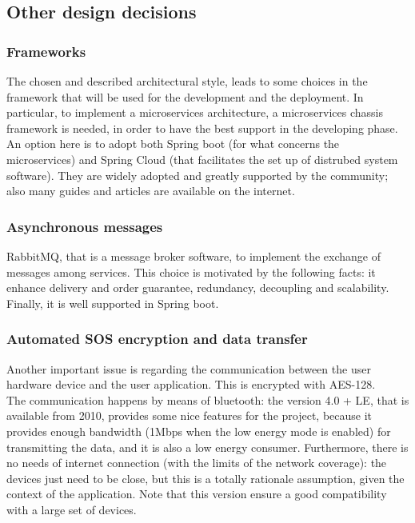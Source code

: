 \subsection{Other design decisions}
\subsubsection{Frameworks}
The chosen and described architectural style, leads to some choices in the framework that will be used for the development and the deployment. 
In particular, to implement a microservices architecture, a microservices chassis framework is needed, in order to have the best support 
in the developing phase. 
An option here is to adopt both Spring boot (for what concerns the microservices) and Spring Cloud (that facilitates the set up of distrubed
system software). They are widely adopted and greatly supported by the community; also many guides and articles are available on the internet. \\

\subsubsection{Asynchronous messages}
RabbitMQ, that is a message broker software, to implement the exchange of messages among services. This choice is motivated 
by the following facts: it enhance delivery and order guarantee, redundancy, decoupling and scalability. 
Finally, it is well supported in Spring boot. 

\subsubsection{Automated SOS encryption and data transfer}
Another important issue is regarding the communication between the user hardware device and the user application. This is encrypted with
AES-128. \\
The communication happens by means of bluetooth: the version 4.0 + LE, that is available from 2010, provides some nice features for the
project, because it provides enough  bandwidth (1Mbps when the low energy mode is enabled) for transmitting the data, and it is also a low
energy consumer. Furthermore, there is no needs of internet connection (with the limits of the network coverage): the devices just need to be
close, but this is a totally rationale assumption, given the context of the application. 
Note that this version ensure a good compatibility with a large set of devices. 


